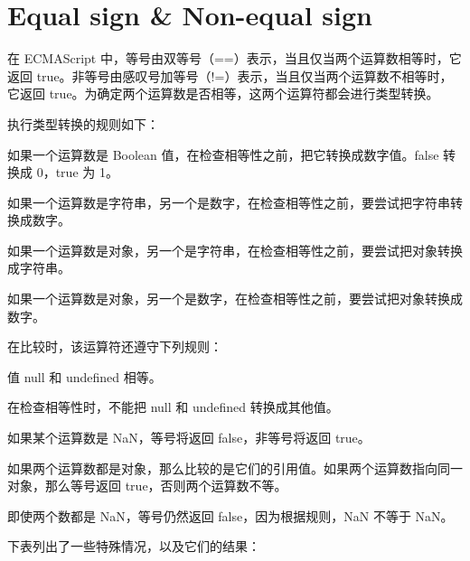 \section{Equal sign \& Non-equal sign}

在 ECMAScript 中，等号由双等号（==）表示，当且仅当两个运算数相等时，它返回 true。非等号由感叹号加等号（!=）表示，当且仅当两个运算数不相等时，它返回 true。为确定两个运算数是否相等，这两个运算符都会进行类型转换。

执行类型转换的规则如下：


\begin{compactitem}
\item 如果一个运算数是 Boolean 值，在检查相等性之前，把它转换成数字值。false 转换成 0，true 为 1。
\item 如果一个运算数是字符串，另一个是数字，在检查相等性之前，要尝试把字符串转换成数字。
\item 如果一个运算数是对象，另一个是字符串，在检查相等性之前，要尝试把对象转换成字符串。
\item 如果一个运算数是对象，另一个是数字，在检查相等性之前，要尝试把对象转换成数字。
\end{compactitem}

在比较时，该运算符还遵守下列规则：

\begin{compactitem}
\item 值 null 和 undefined 相等。
\item 在检查相等性时，不能把 null 和 undefined 转换成其他值。
\item 如果某个运算数是 NaN，等号将返回 false，非等号将返回 true。
\item 如果两个运算数都是对象，那么比较的是它们的引用值。如果两个运算数指向同一对象，那么等号返回 true，否则两个运算数不等。
\end{compactitem}

即使两个数都是 NaN，等号仍然返回 false，因为根据规则，NaN 不等于 NaN。

下表列出了一些特殊情况，以及它们的结果：


